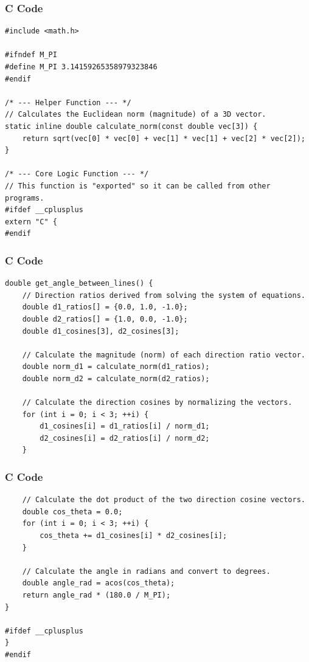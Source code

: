 \documentclass{beamer}
\begin{document}
\begin{frame}[fragile]
\frametitle{C Code }
\begin{lstlisting}
#include <math.h>

#ifndef M_PI
#define M_PI 3.14159265358979323846
#endif

/* --- Helper Function --- */
// Calculates the Euclidean norm (magnitude) of a 3D vector.
static inline double calculate_norm(const double vec[3]) {
    return sqrt(vec[0] * vec[0] + vec[1] * vec[1] + vec[2] * vec[2]);
}

/* --- Core Logic Function --- */
// This function is "exported" so it can be called from other programs.
#ifdef __cplusplus
extern "C" {
#endif

\end{lstlisting}
\end{frame}  
\begin{frame}[fragile]
\frametitle{C Code }
\begin{lstlisting}
double get_angle_between_lines() {
    // Direction ratios derived from solving the system of equations.
    double d1_ratios[] = {0.0, 1.0, -1.0};
    double d2_ratios[] = {1.0, 0.0, -1.0};
    double d1_cosines[3], d2_cosines[3];

    // Calculate the magnitude (norm) of each direction ratio vector.
    double norm_d1 = calculate_norm(d1_ratios);
    double norm_d2 = calculate_norm(d2_ratios);

    // Calculate the direction cosines by normalizing the vectors.
    for (int i = 0; i < 3; ++i) {
        d1_cosines[i] = d1_ratios[i] / norm_d1;
        d2_cosines[i] = d2_ratios[i] / norm_d2;
    }
\end{lstlisting}
\end{frame}  
\begin{frame}[fragile]
\frametitle{C Code }
\begin{lstlisting}
    // Calculate the dot product of the two direction cosine vectors.
    double cos_theta = 0.0;
    for (int i = 0; i < 3; ++i) {
        cos_theta += d1_cosines[i] * d2_cosines[i];
    }
    
    // Calculate the angle in radians and convert to degrees.
    double angle_rad = acos(cos_theta);
    return angle_rad * (180.0 / M_PI);
}

#ifdef __cplusplus
}
#endif
\end{lstlisting}
\end{frame}  
\end{document}
